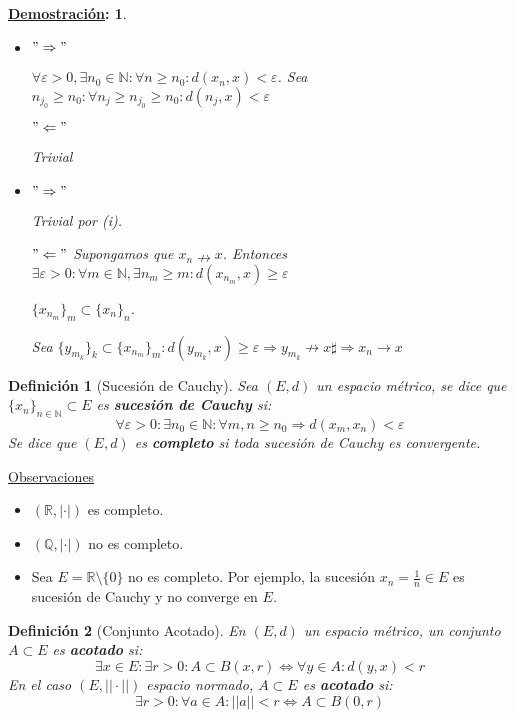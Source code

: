\documentclass[10pt,a4paper,openright]{book}
\theoremstyle{break}
\newtheorem*{defi}{Definición}
\newtheorem*{demo}{\underline{Demostración}:}
\begin{document}
\begin{demo}
\begin{itemize}
\item $"\Rightarrow"$ 

$\forall \varepsilon > 0, \exists n_0 \in \mathbb{N} : \forall n \geq n_0 : d(x_n,x) < \varepsilon$. Sea $n_{j_0} \geq n_0 : \forall n_j \geq n_{j_0} \geq n_0 : d(n_{j}, x) < \varepsilon$

$"\Leftarrow"$

Trivial

\item  $"\Rightarrow"$

Trivial por (i).

$"\Leftarrow"$ Supongamos que $x_n  \nrightarrow x$. Entonces $\exists \varepsilon > 0 : \forall m \in \mathbb{N}, \exists n_m \geq m : d(x_{n_m}, x) \geq \varepsilon$

$\{x_{n_m}\}_m \subset \{x_n\}_n$.

Sea $\{y_{m_k}\}_k \subset \{x_{n_m}\}_m : d(y_{m_k}, x) \geq \varepsilon\Rightarrow y_{m_k} \nrightarrow x \sharp \Rightarrow x_n \rightarrow x$ 
\end{itemize}
\end{demo}

\begin{defi}[Sucesión de Cauchy]
Sea $(E,d)$ un espacio métrico, se dice que $\{x_n\}_{n\in \mathbb{N}} \subset E$ es \textbf{sucesión de Cauchy} si:
$$\forall \varepsilon > 0: \exists n_0 \in \mathbb{N} : \forall m,n \geq n_0 \Rightarrow d(x_m, x_n) < \varepsilon$$
Se dice que $(E,d)$ es \textbf{completo} si toda sucesión de Cauchy es convergente.
\end{defi}

\underline{Observaciones}
\begin{itemize}
\item $(\mathbb{R}, |\cdot|)$ es completo.

\item $(\mathbb{Q}, |\cdot|)$ no es completo.

\item Sea $E = \mathbb{R} \setminus \{0\}$ no es completo. Por ejemplo, la sucesión $x_n = \frac{1}{n} \in E$ es sucesión de Cauchy y no converge en $E$.
\end{itemize}

\begin{defi}[Conjunto Acotado]
En $(E,d)$ un espacio métrico, un conjunto $A \subset E$ es \textbf{acotado} si:
$$\exists x \in E: \exists r > 0 : A \subset B(x,r) \Leftrightarrow \forall y \in A: d(y,x) < r$$
En el caso $(E, ||\cdot||)$ espacio normado, $A \subset E$ es \textbf{acotado} si:
$$\exists r > 0 : \forall a \in A: ||a|| < r  \Leftrightarrow A \subset B(0,r)$$
\end{defi}
\end{document}
